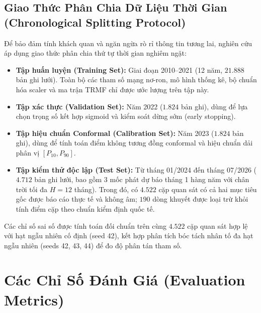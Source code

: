 \subsection{Giao Thức Phân Chia Dữ Liệu Thời Gian (Chronological Splitting Protocol)}
Để bảo đảm tính khách quan và ngăn ngừa rò rỉ thông tin tương lai, nghiên cứu áp dụng giao thức phân chia thứ tự thời gian nghiêm ngặt:
\begin{itemize}
    \item \textbf{Tập huấn luyện (Training Set):} Giai đoạn 2010--2021 (12 năm, $21.888$ bản ghi lưới). Toàn bộ các tham số mạng nơ-ron, mô hình thống kê, bộ chuẩn hóa scaler và ma trận TRMF chỉ được ước lượng trên tập này.
    \item \textbf{Tập xác thực (Validation Set):} Năm 2022 ($1.824$ bản ghi), dùng để lựa chọn trọng số kết hợp sigmoid và kiểm soát dừng sớm (early stopping).
    \item \textbf{Tập hiệu chuẩn Conformal (Calibration Set):} Năm 2023 ($1.824$ bản ghi), dùng để tính toán điểm không tương đồng conformal và hiệu chuẩn dải phân vị $[P_{10}, P_{90}]$.
    \item \textbf{Tập kiểm thử độc lập (Test Set):} Từ tháng 01/2024 đến tháng 07/2026 ($4.712$ bản ghi lưới, bao gồm 3 mốc phát dự báo tháng 1 hàng năm với chân trời tối đa $H=12$ tháng). Trong đó, có $4.522$ cặp quan sát có cả hai mục tiêu gốc được báo cáo thực tế và không âm; $190$ dòng khuyết được loại trừ khỏi tính điểm cặp theo chuẩn kiểm định quốc tế.
\end{itemize}
Các chỉ số sai số được tính toán đối chuẩn trên cùng $4.522$ cặp quan sát hợp lệ với hạt ngẫu nhiên cố định (seed 42), kết hợp phân tích bóc tách nhân tố đa hạt ngẫu nhiên (seeds 42, 43, 44) để đo độ phân tán tham số.

\section{Các Chỉ Số Đánh Giá (Evaluation Metrics)}
\label{sec:evaluation_metrics}


